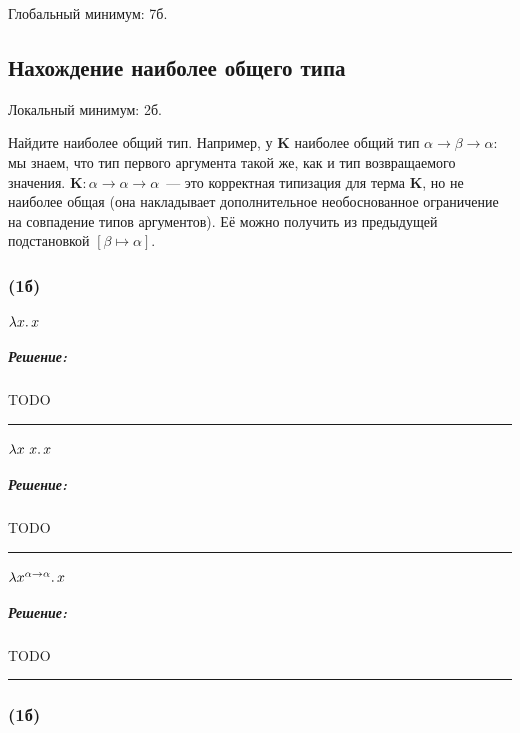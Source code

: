 \documentclass{article}
\newenvironment{proof}{\subparagraph{\hspace{-1em}Решение:\newline}}{\par\noindent\rule{\textwidth}{0.4pt}}
\newcommand{\term}[1]{\mathbf{#1}}
\newcommand{\subst}[3]{\left[#2 \mapsto #3 \right] #1}
\begin{document}
    Глобальный минимум: 7б.

    \subsection{Нахождение наиболее общего типа}

    Локальный минимум: 2б.

    Найдите наиболее общий тип.
    Например, у $\term{K}$ наиболее общий тип $\alpha \to \beta \to \alpha$: мы знаем, что тип первого аргумента такой же, как и тип возвращаемого значения.
    $\term{K} : \alpha \to \alpha \to \alpha$~--- это корректная типизация
    для терма $\term{K}$, но не наиболее общая (она накладывает дополнительное необоснованное ограничение на совпадение типов аргументов).
    Её можно получить из предыдущей подстановкой $\subst{}{\beta}{\alpha}$.

    \subsubsection{(1б)}

    \paragraph{} $\lambda x\ldotp x$

    \begin{proof}
        TODO %
    \end{proof}

    \paragraph{} $\lambda x~x\ldotp x$

    \begin{proof}
        TODO %
    \end{proof}

    \paragraph{} $\lambda x^{\alpha \to \alpha}\ldotp x$

    \begin{proof}
        TODO %
    \end{proof}

    \subsubsection{(1б)}
\end{document}
